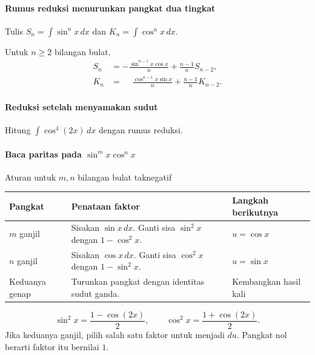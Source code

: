 \documentclass{../../kalkulus-ppt}
\begin{document}
\begin{frame}{\insertsection}
    \framesubtitle{Rumus reduksi menurunkan pangkat dua tingkat}
    Tulis $S_n=\int\sin^n x\,dx$ dan $K_n=\int\cos^n x\,dx$.
    \begin{teorema}
        Untuk $n\ge2$ bilangan bulat,
        \[
            \begin{aligned}
                S_n&=-\frac{\sin^{n-1}x\cos x}{n}+\frac{n-1}{n}S_{n-2},\\
                K_n&=\phantom{-}\frac{\cos^{n-1}x\sin x}{n}+\frac{n-1}{n}K_{n-2}.
            \end{aligned}
        \]
    \end{teorema}
\end{frame}

\begin{frame}{\insertsection}
    \framesubtitle{Reduksi setelah menyamakan sudut}
    \begin{contoh}
        Hitung $\int\cos^4(2x)\,dx$ dengan rumus reduksi.
    \end{contoh}
\end{frame}

\begin{frame}{\insertsection}
    \framesubtitle{Baca paritas pada $\sin^m x\cos^n x$}
    \begin{block}{Aturan untuk $m,n$ bilangan bulat taknegatif}
        \renewcommand{\arraystretch}{1.25}
        \begin{tabularx}{\linewidth}{@{}lXl@{}}
            \textbf{Pangkat} & \textbf{Penataan faktor} & \textbf{Langkah berikutnya}\\ \hline
            $m$ ganjil & Sisakan $\sin x\,dx$. Ganti sisa $\sin^2x$ dengan $1-\cos^2x$. &
                $u=\cos x$\\
            $n$ ganjil & Sisakan $\cos x\,dx$. Ganti sisa $\cos^2x$ dengan $1-\sin^2x$. &
                $u=\sin x$\\
            Keduanya genap & Turunkan pangkat dengan identitas sudut ganda. &
                Kembangkan hasil kali
        \end{tabularx}
    \end{block}
    \[
        \sin^2x=\frac{1-\cos(2x)}{2},\qquad
        \cos^2x=\frac{1+\cos(2x)}{2}.
    \]
    Jika keduanya ganjil, pilih salah satu faktor untuk menjadi $du$.
    Pangkat nol berarti faktor itu bernilai $1$.
\end{frame}
\end{document}
